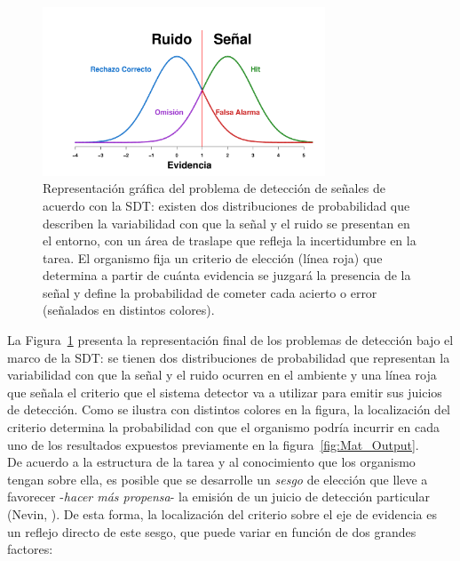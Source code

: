 \begin{figure}[th]
\centering
\includegraphics[width=0.75\textwidth]{Figures/SDT_OutcomesR} 
\caption[Representación gráfica de las tareas de detección y los posibles resultados a obtener]{Representación gráfica del problema de detección de señales de acuerdo con la SDT: existen dos distribuciones de probabilidad que describen la variabilidad con que la señal y el ruido se presentan en el entorno, con un área de traslape que refleja la incertidumbre en la tarea. El organismo fija un criterio de elección (línea roja) que determina a partir de cuánta evidencia se juzgará la presencia de la señal y define la probabilidad de cometer cada acierto o error (señalados en distintos colores).}
\label{fig:Graf_Outputs}
\end{figure}

La Figura~\ref{fig:Graf_Outputs} presenta la representación final de los problemas de detección bajo el marco de la SDT: se tienen dos distribuciones de probabilidad que representan la variabilidad con que la señal y el ruido ocurren en el ambiente y una línea roja que señala el criterio que el sistema detector va a utilizar para emitir sus juicios de detección. Como se ilustra con distintos colores en la figura, la localización del criterio determina la probabilidad con que el organismo podría incurrir en cada uno de los resultados expuestos previamente en la figura~\ref{fig:Mat_Output}.\\

De acuerdo a la estructura de la tarea y al conocimiento que los organismo tengan sobre ella, es posible que se desarrolle un \textit{sesgo} de elección que lleve a favorecer -\textit{hacer más propensa}- la emisión de un juicio de detección particular (Nevin, \citeyear{Nevin1969}). De esta forma, la localización del criterio sobre el eje de evidencia es un reflejo directo de este sesgo, que puede variar en función de dos grandes factores:\\

